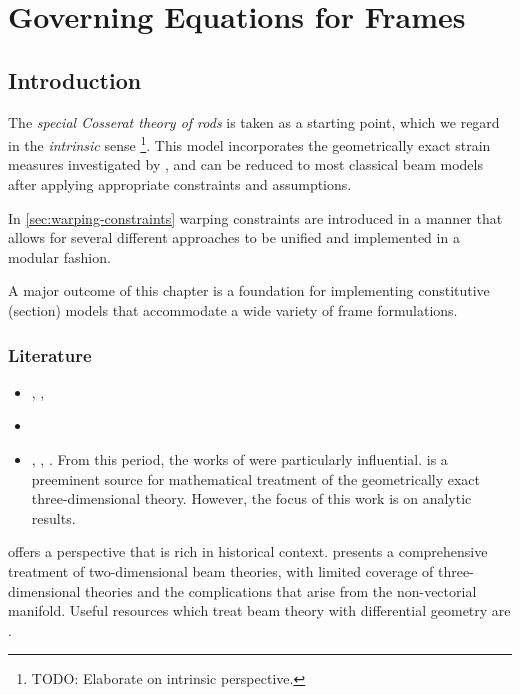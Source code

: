 \chapter{Governing Equations for Frames}\label{ch:frame-equations} 

\section{Introduction}
The \emph{special Cosserat theory of rods} is taken as a starting point, which we regard in the \emph{intrinsic} sense \citep{antman2005nonlinear}\footnote{TODO: Elaborate on intrinsic perspective.}.
This model incorporates the geometrically exact strain measures 
investigated by \cite{cosserat1909theorie}, and can be reduced to
most classical beam models after applying appropriate constraints and assumptions.

In \cref{sec:warping-constraints} warping constraints are introduced in a manner that allows for several different approaches to be unified and implemented in a modular fashion.

A major outcome of this chapter is a foundation for implementing constitutive (section) models that accommodate a wide variety of frame formulations.

\subsection{Literature}

%
\begin{itemize}
    \item \cite{euler1744curvis}, \cite{kirchhoff1859ueber}, \cite{love1906treatise}

    \item \cite{cosserat1896theorie}

    \item \cite{ericksen1957exact}, \cite{green1966general},  \cite{naghdi1973theory}.
    From this period, the works of \cite{antman1973theory,antman1974kirchhoffs} were particularly influential. \cite{antman2005nonlinear} is a preeminent source for mathematical treatment of the geometrically exact three-dimensional theory. However, the focus of this work is on analytic results. 

\end{itemize}

\cite{oreilly2017modeling} offers a perspective that is rich in historical context. 
\cite{hjelmstad2005fundamentals} presents a comprehensive treatment of two-dimensional beam theories, with limited coverage of three-dimensional theories and the complications that arise from the non-vectorial manifold.
Useful resources which treat beam theory with  differential geometry are \cite{landau1970theory,connor1976analysis}.

